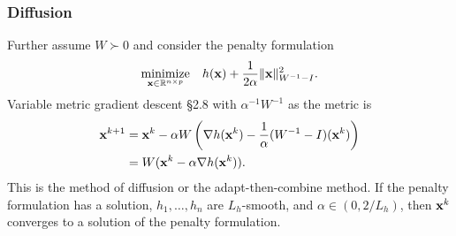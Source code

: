\documentclass[10pt,mathserif]{beamer}
\begin{document}
\begin{frame}
\frametitle{Diffusion}
Further assume $W\succ 0$ and consider the penalty formulation
\[
\begin{array}{ll}
\underset{{\mathbf{x}}\in\mathbb{R}^{n\times p}}{\mbox{minimize}} &\displaystyle{h({\mathbf{x}}) + \frac{1}{2\alpha}\|{\mathbf{x}}\|^2_{W^{-1}-I}}.
\end{array}
\]
Variable metric gradient descent \S2.8 with $\alpha^{-1} W^{-1}$ as the metric is
\begin{align*}
{\mathbf{x}}^{k+1}  &=
{\mathbf{x}}^k-\alpha W\left( \nabla h({\mathbf{x}}^k)-\frac{1}{\alpha}(W^{-1}-I)({\mathbf{x}}^k)\right)
\\
&= W({\mathbf{x}}^k - \alpha \nabla h({\mathbf{x}}^k)).
\end{align*}
This is the method of diffusion or the adapt-then-combine method.
If the penalty formulation has a solution, $h_1,\dots,h_n$ are $L_h$-smooth, and $\alpha \in (0,2/L_h)$, then ${\mathbf{x}}^k$ converges to a solution of the penalty formulation.




\end{frame}
\end{document}
